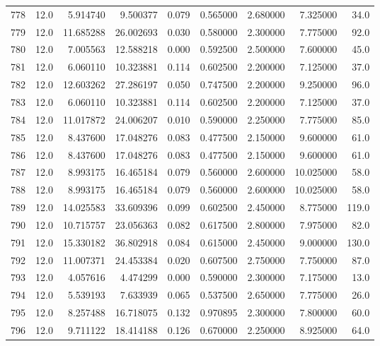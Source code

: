 \begin{tabular}{lrrrrrrrr}
778  &   12.0 &   5.914740 &   9.500377 &  0.079 &  0.565000 &  2.680000 &   7.325000 &   34.0 \\
779  &   12.0 &  11.685288 &  26.002693 &  0.030 &  0.580000 &  2.300000 &   7.775000 &   92.0 \\
780  &   12.0 &   7.005563 &  12.588218 &  0.000 &  0.592500 &  2.500000 &   7.600000 &   45.0 \\
781  &   12.0 &   6.060110 &  10.323881 &  0.114 &  0.602500 &  2.200000 &   7.125000 &   37.0 \\
782  &   12.0 &  12.603262 &  27.286197 &  0.050 &  0.747500 &  2.200000 &   9.250000 &   96.0 \\
783  &   12.0 &   6.060110 &  10.323881 &  0.114 &  0.602500 &  2.200000 &   7.125000 &   37.0 \\
784  &   12.0 &  11.017872 &  24.006207 &  0.010 &  0.590000 &  2.250000 &   7.775000 &   85.0 \\
785  &   12.0 &   8.437600 &  17.048276 &  0.083 &  0.477500 &  2.150000 &   9.600000 &   61.0 \\
786  &   12.0 &   8.437600 &  17.048276 &  0.083 &  0.477500 &  2.150000 &   9.600000 &   61.0 \\
787  &   12.0 &   8.993175 &  16.465184 &  0.079 &  0.560000 &  2.600000 &  10.025000 &   58.0 \\
788  &   12.0 &   8.993175 &  16.465184 &  0.079 &  0.560000 &  2.600000 &  10.025000 &   58.0 \\
789  &   12.0 &  14.025583 &  33.609396 &  0.099 &  0.602500 &  2.450000 &   8.775000 &  119.0 \\
790  &   12.0 &  10.715757 &  23.056363 &  0.082 &  0.617500 &  2.800000 &   7.975000 &   82.0 \\
791  &   12.0 &  15.330182 &  36.802918 &  0.084 &  0.615000 &  2.450000 &   9.000000 &  130.0 \\
792  &   12.0 &  11.007371 &  24.453384 &  0.020 &  0.607500 &  2.750000 &   7.750000 &   87.0 \\
793  &   12.0 &   4.057616 &   4.474299 &  0.000 &  0.590000 &  2.300000 &   7.175000 &   13.0 \\
794  &   12.0 &   5.539193 &   7.633939 &  0.065 &  0.537500 &  2.650000 &   7.775000 &   26.0 \\
795  &   12.0 &   8.257488 &  16.718075 &  0.132 &  0.970895 &  2.300000 &   7.800000 &   60.0 \\
796  &   12.0 &   9.711122 &  18.414188 &  0.126 &  0.670000 &  2.250000 &   8.925000 &   64.0 \\

\end{tabular}
